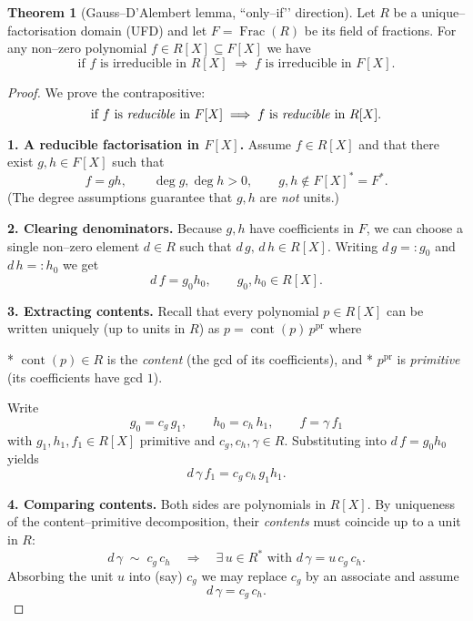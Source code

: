 \documentclass[12pt]{article}
\title{}
\author{Jerich Lee}
\date{\today}
\theoremstyle{definition} %
\newtheorem{theorem}{Theorem}
\theoremstyle{plain} %
\begin{document}
\maketitle
\begin{theorem}[Gauss--D’Alembert lemma, ``only–if’’ direction]%
  \label{thm:UFD_to_fraction_field}
  Let \(R\) be a unique–factorisation domain (UFD) and let
  \(F=\operatorname{Frac}(R)\) be its field of fractions.
  For any non–zero polynomial \(f\in R[X]\subseteq F[X]\) we have
  \[
     \text{if }f\text{ is irreducible in }R[X]
     \;\Longrightarrow\;
     f\text{ is irreducible in }F[X].
  \]
  \end{theorem}
  
  \begin{proof}
  We prove the contrapositive:
  \[
     \text{if }f\text{ is \emph{reducible} in }F[X]
     \;\Longrightarrow\;
     f\text{ is \emph{reducible} in }R[X].
  \]
  
  \medskip
  \textbf{1.  A reducible factorisation in \(F[X]\).}
  Assume \(f\in R[X]\) and that there exist \(g,h\in F[X]\) such that
  \[
     f = gh, \qquad 
     \deg g,\deg h > 0, \qquad
     g,h\notin F[X]^{\!*}=F^{\!*}.
  \]
  (The degree assumptions guarantee that \(g,h\) are \emph{not} units.)
  
  \medskip
  \textbf{2.  Clearing denominators.}
  Because \(g,h\) have coefficients in \(F\), we can choose a single
  non–zero element \(d\in R\) such that
  \(d\,g,\,d\,h\in R[X]\).
  Writing \(d\,g=:g_0\) and \(d\,h=:h_0\) we get
  \[
     d\,f = g_0h_0, \qquad g_0,h_0\in R[X].
  \]
  
  \medskip
  \textbf{3.  Extracting contents.}
  Recall that every polynomial \(p\in R[X]\) can be written uniquely (up to
  units in \(R\)) as \(p=\operatorname{cont}(p)\,p^{\mathrm{pr}}\) where
  
  * \(\operatorname{cont}(p)\in R\) is the \emph{content} (the gcd of its
    coefficients), and  
  * \(p^{\mathrm{pr}}\) is \emph{primitive} (its coefficients have gcd \(1\)).
  
  Write
  \[
     g_0 = c_g\,g_1,\qquad
     h_0 = c_h\,h_1,\qquad
     f   = \gamma\,f_1
  \]
  with \(g_1,h_1,f_1\in R[X]\) primitive and
  \(c_g,c_h,\gamma\in R\).
  Substituting into \(d\,f=g_0h_0\) yields
  \[
     d\,\gamma\,f_1 = c_g\,c_h\,g_1h_1.
  \]
  
  \medskip
  \textbf{4.  Comparing contents.}
  Both sides are polynomials in \(R[X]\).
  By uniqueness of the content–primitive decomposition,
  their \emph{contents} must coincide up to a unit in \(R\):
  \[
     d\,\gamma \;\sim\; c_g\,c_h
     \quad\Longrightarrow\quad
     \exists\,u\in R^{\!*}\text{ with }d\,\gamma = u\,c_g\,c_h.
  \]
  Absorbing the unit \(u\) into (say) \(c_g\) we may replace \(c_g\) by an
  associate and assume
  \[
     d\,\gamma = c_g\,c_h.
  \]
  

\end{proof}
\end{document}
